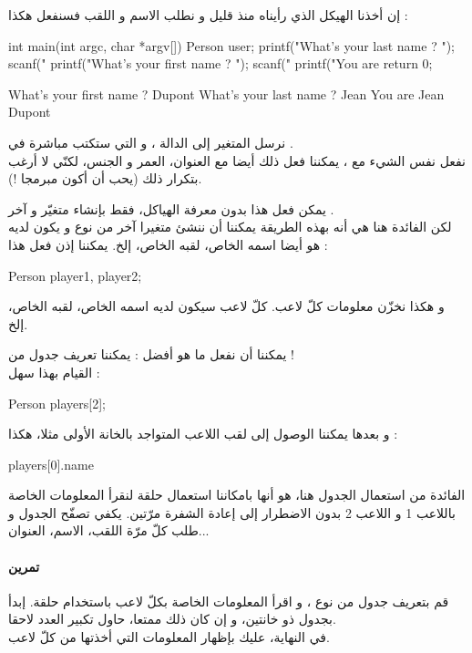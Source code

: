 إن أخذنا الهيكل
الذي رأيناه منذ قليل و نطلب الاسم و اللقب فسنفعل هكذا :
\begin{Csource}
int main(int argc, char *argv[])
{
	Person user;
  printf("What's your last name ? ");
	scanf("%
	printf("What's your first name ? ");
	scanf("%
	printf("You are %
	return 0;
}
\end{Csource}
\begin{Console}
What's your first name ? Dupont
What's your last name ? Jean
You are Jean Dupont
\end{Console}
نرسل المتغير
إلى الدالة
،
و التي ستكتب مباشرة في
.\\
نفعل نفس الشيء مع
،
يمكننا فعل ذلك أيضا مع العنوان، العمر و الجنس، لكنّي لا أرغب بتكرار ذلك (يحب أن أكون مبرمجا !).

يمكن فعل هذا بدون معرفة الهياكل، فقط بإنشاء متغيّر
و آخر
.\\
لكن الفائدة هنا هي أنه بهذه الطريقة يمكننا أن ننشئ متغيرا آخر من نوع
و يكون لديه هو أيضا اسمه الخاص، لقبه الخاص، إلخ. يمكننا إذن فعل هذا :
\begin{Csource}
Person player1, player2;
\end{Csource}
و هكذا نخزّن معلومات كلّ لاعب. كلّ لاعب سيكون لديه اسمه الخاص، لقبه الخاص، إلخ.

يمكننا أن نفعل ما هو أفضل : يمكننا تعريف جدول من
 !\\
القيام بهذا سهل :
\begin{Csource}
Person players[2];
\end{Csource}
و بعدها يمكننا الوصول إلى لقب اللاعب المتواجد بالخانة الأولى مثلا، هكذا :
\begin{Console}
players[0].name
\end{Console}
الفائدة من استعمال الجدول هنا، هو أنها بامكاننا استعمال حلقة لنقرأ المعلومات الخاصة باللاعب 1 و اللاعب 2 بدون الاضطرار إلى إعادة الشفرة مرّتين. يكفي تصفّح الجدول
و طلب كلّ مرّة اللقب، الاسم، العنوان...

\paragraph{تمرين}
قم بتعريف جدول من نوع
،
و اقرأ المعلومات الخاصة بكلّ لاعب باستخدام حلقة. إبدأ بجدول ذو خانتين، و إن كان ذلك ممتعا، حاول تكبير العدد لاحقا.\\
في النهاية، عليك بإظهار المعلومات التي أخذتها من كلّ لاعب.
